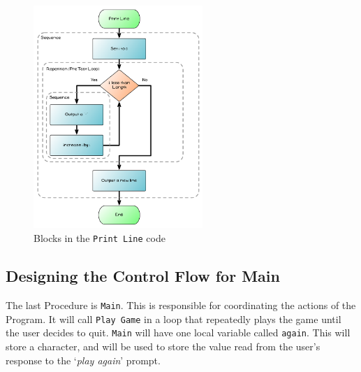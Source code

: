 \begin{figure}[htbp]
   \centering
   \includegraphics[width=0.57\textwidth]{./topics/control-flow/diagrams/PrintLine1} 
   \caption{Blocks in the \texttt{Print Line} code}
   \label{fig:print-line-diag-1}
\end{figure}





\clearpage
\subsection{Designing the Control Flow for Main} %
\label{sub:designing_the_control_flow_for_main}

The last Procedure is \texttt{Main}. This is responsible for coordinating the actions of the Program. It will call \texttt{Play Game} in a loop that repeatedly plays the game until the user decides to quit. \texttt{Main} will have one local variable called \texttt{again}. This will store a character, and will be used to store the value read from the user's response to the `\emph{play again}' prompt.

